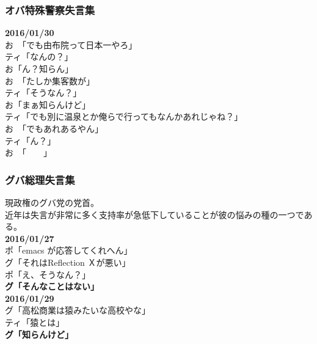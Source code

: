 \subsubsection{オバ特殊警察失言集}
{\bf 2016/01/30}\\
お　「でも由布院って日本一やろ」\\ 
ティ「なんの？」 \\
{\Large お「ん？知らん」}\\ 
お　「たしか集客数が」\\ 
ティ「そうなん？」 \\
{\Large お「まぁ知らんけど」}\\ 
ティ「でも別に温泉とか俺らで行ってもなんかあれじゃね？」 \\
お　「でもあれあるやん」 \\
ティ「ん？」 \\
お　「　　」\\

\subsubsection{グバ総理失言集}
現政権のグバ党の党首。\\ 
近年は失言が非常に多く支持率が急低下していることが彼の悩みの種の一つである。 \\
{\bf 2016/01/27}\\
ポ「emacs が応答してくれへん」 \\
グ「それはReflection Ｘが悪い」 \\
ポ「え、そうなん？」 \\
{\Large {\bf グ「そんなことはない」}}\\

{\bf 2016/01/29}\\
グ「高松商業は猿みたいな高校やな」 \\
ティ「猿とは」 \\
{\Large {\bf グ「知らんけど」}}\\

